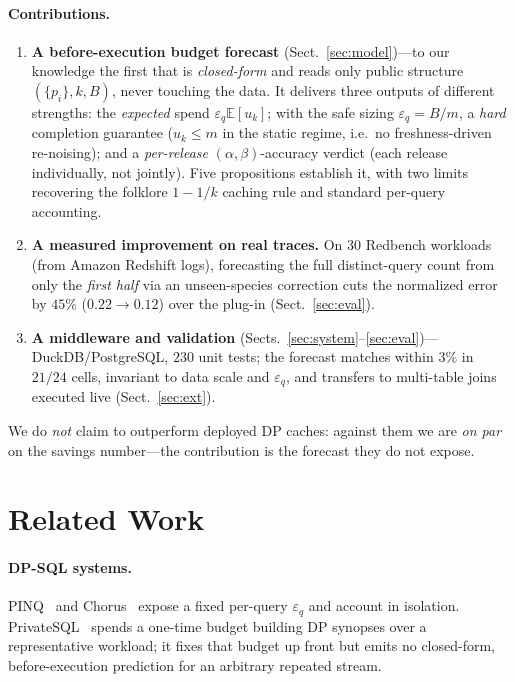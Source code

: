 \documentclass[runningheads]{llncs}
\newcommand{\eps}{\varepsilon}
\newcommand{\E}{\mathbb{E}}
\begin{document}
\paragraph{Contributions.}
\begin{enumerate}
\item \textbf{A before-execution budget forecast} (Sect.~\ref{sec:model})---to our knowledge the first that is \emph{closed-form} and reads only public structure $(\{p_i\},k,B)$, never touching the data. It delivers three outputs of different strengths: the \emph{expected} spend $\eps_q\E[u_k]$; with the safe sizing $\eps_q{=}B/m$, a \emph{hard} completion guarantee ($u_k\le m$ in the static regime, i.e.\ no freshness-driven re-noising); and a \emph{per-release} $(\alpha,\beta)$-accuracy verdict (each release individually, not jointly). Five propositions establish it, with two limits recovering the folklore $1-1/k$ caching rule and standard per-query accounting.
\item \textbf{A measured improvement on real traces.} On $30$ Redbench workloads (from Amazon Redshift logs), forecasting the full distinct-query count from only the \emph{first half} via an unseen-species correction cuts the normalized error by $45\%$ ($0.22\!\to\!0.12$) over the plug-in (Sect.~\ref{sec:eval}).
\item \textbf{A middleware and validation} (Sects.~\ref{sec:system}--\ref{sec:eval})---DuckDB/PostgreSQL, $230$ unit tests; the forecast matches within $3\%$ in $21/24$ cells, invariant to data scale and $\eps_q$, and transfers to multi-table joins executed live (Sect.~\ref{sec:ext}).
\end{enumerate}
We do \emph{not} claim to outperform deployed DP caches: against them we are \emph{on par} on the savings number---the contribution is the forecast they do not expose.

\section{Related Work}
\label{sec:related}

\paragraph{DP-SQL systems.} PINQ~\cite{mcsherry2009privacy} and Chorus~\cite{johnson2020chorus} expose a fixed per-query $\eps_q$ and account in isolation. PrivateSQL~\cite{kotsogiannis2019privatesql} spends a one-time budget building DP synopses over a representative workload; it fixes that budget up front but emits no closed-form, before-execution prediction for an arbitrary repeated stream.
\end{document}
